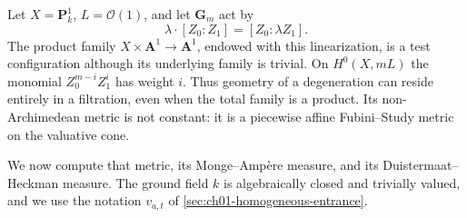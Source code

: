Let $X=\mathbf P^1_k$, $L=\mathcal O(1)$, and let $\mathbf G_m$ act by
\[
                 \lambda\cdot[Z_0:Z_1]=[Z_0:\lambda Z_1].
\]
The product family $X\times\mathbf A^1\to\mathbf A^1$, endowed with this
linearization, is a test configuration although its underlying family is
trivial.  On $H^0(X,mL)$ the monomial $Z_0^{m-i}Z_1^i$ has weight $i$.
Thus geometry of a degeneration can reside entirely in a filtration, even
when the total family is a product.  Its non-Archimedean metric is not
constant: it is a piecewise affine Fubini--Study metric on the valuative cone.

We now compute that metric, its Monge--Amp\`ere measure, and its
Duistermaat--Heckman measure.  The ground field $k$ is algebraically closed
and trivially valued, and we use the notation $v_{a,t}$ of
\cref{sec:ch01-homogeneous-entrance}.

